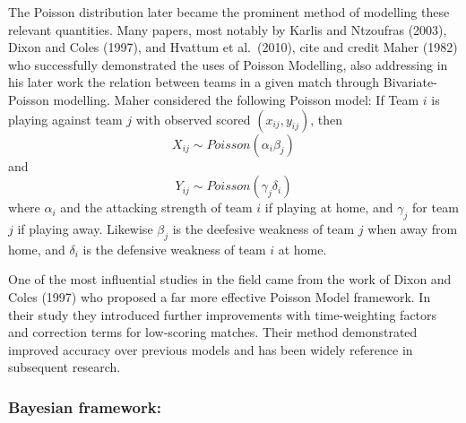 \documentclass[
]{article}
\begin{document}
The Poisson distribution later became the prominent method of modelling
these relevant quantities. Many papers, most notably by Karlis and
Ntzoufras (2003), Dixon and Coles (1997), and Hvattum et al.~(2010),
cite and credit Maher (1982) who successfully demonstrated the uses of
Poisson Modelling, also addressing in his later work the relation
between teams in a given match through Bivariate-Poisson modelling.
Maher considered the following Poisson model: If Team \(i\) is playing
against team \(j\) with observed scored \((x_{ij},y_{ij})\), then
\[X_{ij} \sim Poisson(\alpha_i\beta_j)\] and
\[Y_{ij} \sim Poisson(\gamma_j\delta_i)\] where \(\alpha_i\) and the
attacking strength of team \(i\) if playing at home, and \(\gamma_j\)
for team \(j\) if playing away. Likewise \(\beta_j\) is the deefesive
weakness of team \(j\) when away from home, and \(\delta_i\) is the
defensive weakness of team \(i\) at home.

One of the most influential studies in the field came from the work of
Dixon and Coles (1997) who proposed a far more effective Poisson Model
framework. In their study they introduced further improvements with
time-weighting factors and correction terms for low-scoring matches.
Their method demonstrated improved accuracy over previous models and has
been widely reference in subsequent research.

\hypertarget{bayesian-framework}{%
\subsubsection{Bayesian framework:}\label{bayesian-framework}}
\end{document}
